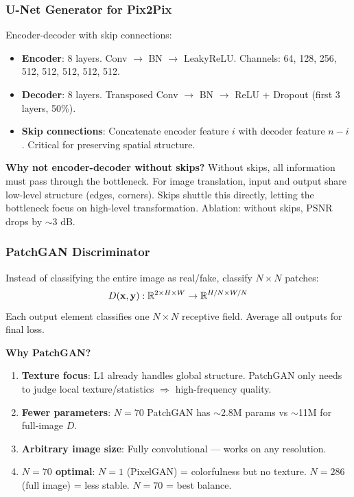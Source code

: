 \subsubsection{U-Net Generator for Pix2Pix}
Encoder-decoder with skip connections:
\begin{itemize}
\item \textbf{Encoder}: 8 layers. Conv $\to$ BN $\to$ LeakyReLU. Channels: 64, 128, 256, 512, 512, 512, 512, 512.
\item \textbf{Decoder}: 8 layers. Transposed Conv $\to$ BN $\to$ ReLU + Dropout (first 3 layers, 50\%).
\item \textbf{Skip connections}: Concatenate encoder feature $i$ with decoder feature $n{-}i$. Critical for preserving spatial structure.
\end{itemize}

\textbf{Why not encoder-decoder without skips?} Without skips, all information must pass through the bottleneck. For image translation, input and output share low-level structure (edges, corners). Skips shuttle this directly, letting the bottleneck focus on high-level transformation. Ablation: without skips, PSNR drops by $\sim$3 dB.

\subsubsection{PatchGAN Discriminator}
Instead of classifying the entire image as real/fake, classify $N{\times}N$ patches:
$$D(\mathbf{x}, \mathbf{y}): \mathbb{R}^{2 \times H \times W} \to \mathbb{R}^{H/N \times W/N}$$
Each output element classifies one $N{\times}N$ receptive field. Average all outputs for final loss.

\textbf{Why PatchGAN?}
\begin{enumerate}
\item \textbf{Texture focus}: L1 already handles global structure. PatchGAN only needs to judge local texture/statistics $\Rightarrow$ high-frequency quality.
\item \textbf{Fewer parameters}: $N{=}70$ PatchGAN has $\sim$2.8M params vs $\sim$11M for full-image $D$.
\item \textbf{Arbitrary image size}: Fully convolutional — works on any resolution.
\item \textbf{$N{=}70$ optimal}: $N{=}1$ (PixelGAN) = colorfulness but no texture. $N{=}286$ (full image) = less stable. $N{=}70$ = best balance.
\end{enumerate}

